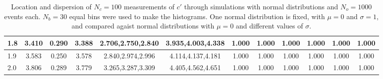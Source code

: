 \begin{table*}[t]
\begin{center}
\begin{tabular}{| l | c | c | c | c | c | c | c | c | c | c | c |}
1.8 & 3.410 & 0.290 & 3.388 & 2.706,2.750,2.840 & 3.935,4.003,4.338  & 1.000  & 1.000  & 1.000  & 1.000  & 1.000  & 1.000 \\\hline
1.9 & 3.583 & 0.250 & 3.578 & 2.840,2.974,2.996 & 4.114,4.137,4.181  & 1.000  & 1.000  & 1.000  & 1.000  & 1.000  & 1.000 \\\hline
2.0 & 3.806 & 0.289 & 3.779 & 3.265,3.287,3.309 & 4.405,4.562,4.651  & 1.000  & 1.000  & 1.000  & 1.000  & 1.000  & 1.000 \\\hline
\end{tabular}
\caption{Location and dispersion of $N_c=100$
measurements of $c'$ through simulations
with normal distributions and $N_o=1000$ events each.
$N_b=30$ equal bins were used to make the histograms.
One normal distribution is fixed, with $\mu=0$ and $\sigma=1$,
and compared agaist normal distributions with $\mu=0$
and different values of $\sigma$.}
\end{center}
\end{table*}
